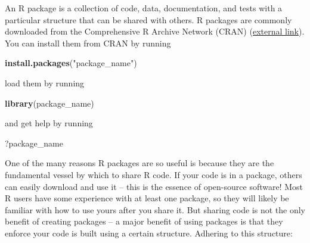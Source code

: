 \documentclass[
]{book}
\newenvironment{Shaded}{\begin{snugshade}}{\end{snugshade}}
\newcommand{\KeywordTok}[1]{\textcolor[rgb]{0.13,0.29,0.53}{\textbf{#1}}}
\newcommand{\NormalTok}[1]{#1}
\newcommand{\StringTok}[1]{\textcolor[rgb]{0.31,0.60,0.02}{#1}}
\begin{document}
An R package is a collection of code, data, documentation, and tests with a particular structure that can be shared with others. R packages are commonly downloaded from the Comprehensive R Archive Network (CRAN) (\href{https://cran.r-project.org/}{external link}). You can install them from CRAN by running

\begin{Shaded}
\begin{Highlighting}[]
\KeywordTok{install.packages}\NormalTok{(}\StringTok{"package_name"}\NormalTok{)}
\end{Highlighting}
\end{Shaded}

load them by running

\begin{Shaded}
\begin{Highlighting}[]
\KeywordTok{library}\NormalTok{(package_name)}
\end{Highlighting}
\end{Shaded}

and get help by running

\begin{Shaded}
\begin{Highlighting}[]
\NormalTok{?package_name}
\end{Highlighting}
\end{Shaded}

One of the many reasons R packages are so useful is because they are the fundamental vessel by which to share R code. If your code is in a package, others can easily download and use it -- this is the essence of open-source software! Most R users have some experience with at least one package, so they will likely be familiar with how to use yours after you share it. But sharing code is not the only benefit of creating packages -- a major benefit of using packages is that they enforce your code is built using a certain structure. Adhering to this structure:
\end{document}
